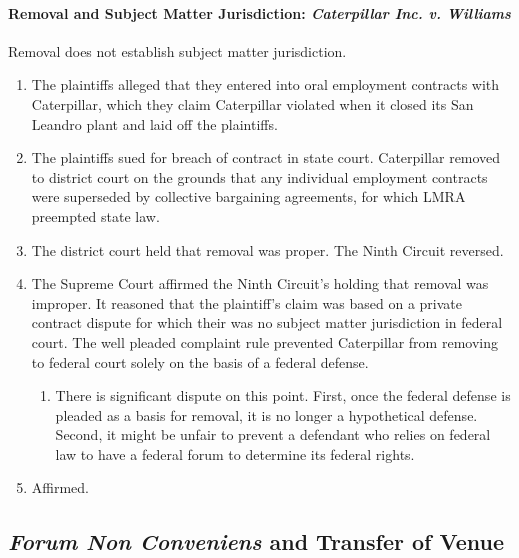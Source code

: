 \paragraph{Removal and Subject Matter Jurisdiction: \emph{Caterpillar Inc. v. Williams}}

Removal does not establish subject matter jurisdiction.

\begin{enumerate}
    \item The plaintiffs alleged that they entered into oral employment 
    contracts with Caterpillar, which they claim Caterpillar violated when it closed 
    its San Leandro plant and laid off the plaintiffs.
    \item The plaintiffs sued for 
    breach of contract in state court. Caterpillar removed to district court 
    on the grounds that any individual employment contracts were superseded by 
    collective bargaining agreements, for which LMRA preempted state law.
    \item The district court held that removal was proper. The Ninth Circuit 
    reversed.
    \item The Supreme Court affirmed the Ninth Circuit's holding that removal 
    was improper. It reasoned that the plaintiff's claim 
    was based on a private contract dispute for which their was no subject 
    matter jurisdiction in federal court. The well pleaded complaint rule 
    prevented Caterpillar from removing to federal court solely on the basis 
    of a federal defense.
    \begin{enumerate}
        \item There is significant dispute on this point. First, once the 
        federal defense is pleaded as a basis for removal, it is no longer a 
        hypothetical defense. Second, it might be unfair to prevent a 
        defendant who relies on federal law to have a federal forum to 
        determine its federal rights.
    \end{enumerate}
    \item Affirmed.
\end{enumerate}

\subsection{\emph{Forum Non Conveniens} and Transfer of Venue}

